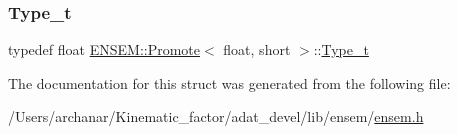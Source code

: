\subsubsection{\texorpdfstring{Type\_t}{Type\_t}\hspace{0.1cm}{\footnotesize\ttfamily [2/2]}}
{\footnotesize\ttfamily typedef float \mbox{\hyperlink{structENSEM_1_1Promote}{E\+N\+S\+E\+M\+::\+Promote}}$<$ float, short $>$\+::\mbox{\hyperlink{structENSEM_1_1Promote_3_01float_00_01short_01_4_a353d7eb6960736f72669b0ec69c11319}{Type\+\_\+t}}}



The documentation for this struct was generated from the following file\+:\begin{DoxyCompactItemize}
\item 
/\+Users/archanar/\+Kinematic\+\_\+factor/adat\+\_\+devel/lib/ensem/\mbox{\hyperlink{lib_2ensem_2ensem_8h}{ensem.\+h}}\end{DoxyCompactItemize}
